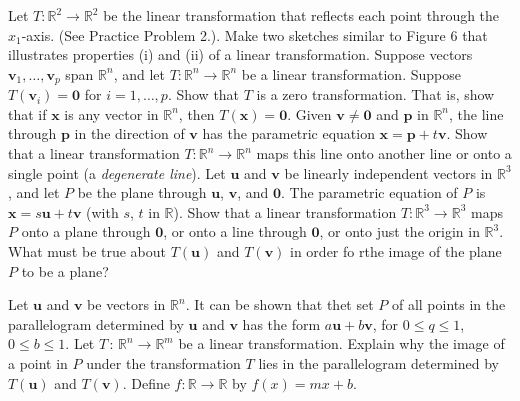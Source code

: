 \documentclass[11pt,answers]{exam} %
\renewcommand{\vec}[1]{\mathbf{#1}}
\begin{document}
\begin{questions}
    \question Let $T : \mathbb{R}^2 \rightarrow \mathbb{R}^2$ be the linear transformation that reflects each point through the $x_1$-axis. (See Practice Problem 2.). Make two sketches similar to Figure 6 that illustrates properties (i) and (ii) of a linear transformation.
    \question Suppose vectors $\vec{v}_1, \ldots, \vec{v}_p$ span $\mathbb{R}^n$, and let $T : \mathbb{R}^n \rightarrow \mathbb{R}^n$ be a linear transformation. Suppose $T(\vec{v}_i) = \vec{0}$ for $i=1,\ldots,p$. Show that $T$ is a zero transformation. That is, show that if $\vec{x}$ is any vector in $\mathbb{R}^n$, then $T(\vec{x}) = \vec{0}$.
    \question Given $\vec{v}\neq\vec{0}$ and $\vec{p}$ in $\mathbb{R}^n$, the line through $\vec{p}$ in the direction of $\vec{v}$ has the parametric equation $\vec{x}=\vec{p}+t\vec{v}$. Show that a linear transformation $T:\mathbb{R}^n\rightarrow\mathbb{R}^n$ maps this line onto another line or onto a single point (a \emph{degenerate line}).
    \question Let $\vec{u}$ and $\vec{v}$ be linearly independent vectors in $\mathbb{R}^3$, and let $P$ be the plane through $\vec{u}$, $\vec{v}$, and $\vec{0}$. The parametric equation of $P$ is $\vec{x}=s\vec{u}+t\vec{v}$ (with $s$, $t$ in $\mathbb{R}$). Show that a linear transformation $T:\mathbb{R}^3 \rightarrow \mathbb{R}^3$ maps $P$ onto a plane through $\vec{0}$, or onto a line through $\vec{0}$, or onto just the origin in $\mathbb{R}^3$. What must be true about $T(\vec{u})$ and $T(\vec{v})$ in order fo rthe image of the plane $P$ to be a plane?

    \question Let $\vec{u}$ and $\vec{v}$ be vectors in $\mathbb{R}^n$. It can be shown that thet set $P$ of all points in the parallelogram determined by $\vec{u}$ and $\vec{v}$ has the form $a\vec{u}+b\vec{v}$, for $0 \leq q \leq 1$, $0 \leq b \leq 1$.  Let $T \, : \, \mathbb{R}^n \rightarrow \mathbb{R}^m$ be a linear transformation. Explain why the image of a point in $P$ under the transformation $T$ lies in the parallelogram determined by $T(\vec{u})$ and $T(\vec{v})$.
    \question Define $f : \mathbb{R} \rightarrow \mathbb{R}$ by $f(x) = mx+b$.
\end{questions}
\end{document}
